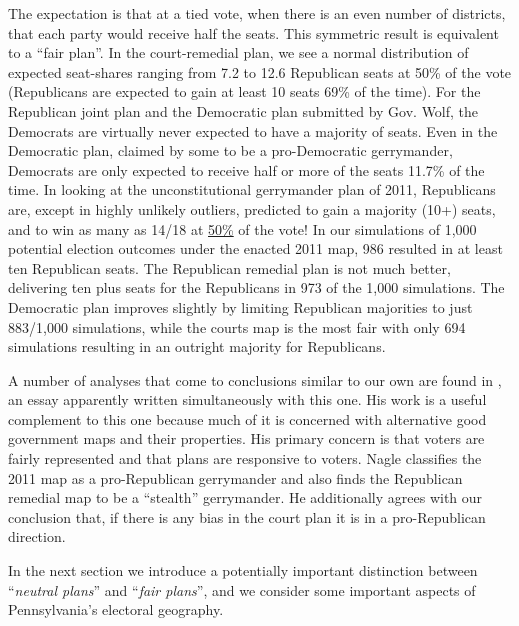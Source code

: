     The expectation is that at a tied vote, when there is an even number of districts, that each party would receive half the seats. This symmetric result is equivalent to a ``fair plan''. In the court-remedial plan, we see a normal distribution of expected seat-shares ranging from 7.2 to 12.6 Republican seats at 50\% of the vote (Republicans are expected to gain at least 10 seats 69\% of the time). For the Republican joint plan and the Democratic plan submitted by Gov. Wolf, the Democrats are virtually never expected to have a majority of seats. Even in the Democratic plan, claimed by some to be a pro-Democratic gerrymander, Democrats are only expected to receive half or more of the seats 11.7\% of the time. In looking at the unconstitutional gerrymander plan of 2011, Republicans are, except in highly unlikely outliers, predicted to gain a majority (10+) seats, and to win as many as 14/18 at \underline{50\%} of the vote! In our simulations of 1,000 potential election outcomes under the enacted 2011 map, 986 resulted in at least ten Republican seats. The Republican remedial plan is not much better, delivering ten plus seats for the Republicans in 973 of the 1,000 simulations. The Democratic plan improves slightly by limiting Republican majorities to just 883/1,000 simulations, while the courts map is the most fair with only 694 simulations resulting in an outright majority for Republicans. 
\par
    A number of analyses that come to conclusions similar to our own are found in \citet{Nagle2019_ELJ}, an essay apparently written simultaneously with this one. His work is a useful complement to this one because much of it is concerned with alternative good government maps and their properties. His primary concern is that voters are fairly represented and that plans are responsive to voters. Nagle classifies the 2011 map as a pro-Republican gerrymander and also finds the Republican remedial map to be a ``stealth'' gerrymander. He additionally agrees with our conclusion that, if there is any bias in the court plan it is in a pro-Republican direction.
\par    
    In the next section we introduce a potentially important distinction between ``\textit{neutral plans}'' and ``\textit{fair plans}'', and we consider some important aspects of Pennsylvania's electoral geography.
\par
%
